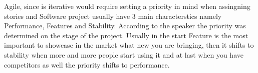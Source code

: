 Agile, since is iterative would require setting a priority in mind when assingning stories and Software project usually have 3 main characterstics namely Performance, Features and Stability. According to the speaker the priority was determined on the stage of the project. Usually in the start Feature is the most important to showcase in the market what new you are bringing, then it shifts to stability when more and more people start using it and at last when you have competitors as well the priority shifts to performance.